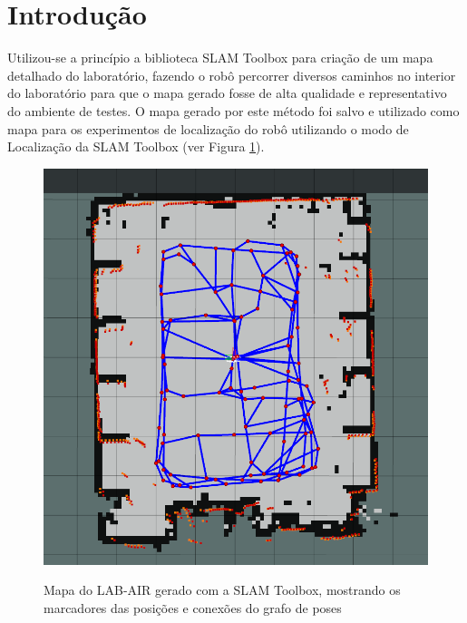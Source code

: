 

\label{Cap04}
\section{Introdução}



Utilizou-se a princípio a biblioteca SLAM Toolbox para criação de um mapa detalhado do laboratório, fazendo o robô percorrer diversos caminhos no interior do laboratório para que o mapa gerado fosse de alta qualidade e representativo do ambiente de testes. O mapa gerado por este método foi salvo e utilizado como mapa para os experimentos de localização do robô utilizando o modo de Localização da SLAM Toolbox (ver Figura \ref{fig:Exp_mapa_LABAIR}).

\begin{figure}[htb]
    \centering
    \caption{Mapa do LAB-AIR gerado com a SLAM Toolbox, mostrando os marcadores das posições e conexões do grafo de poses}
    \includegraphics[width=0.5\linewidth]{img/mapa_localizacao.png}
    \source
    \label{fig:Exp_mapa_LABAIR}
\end{figure}

